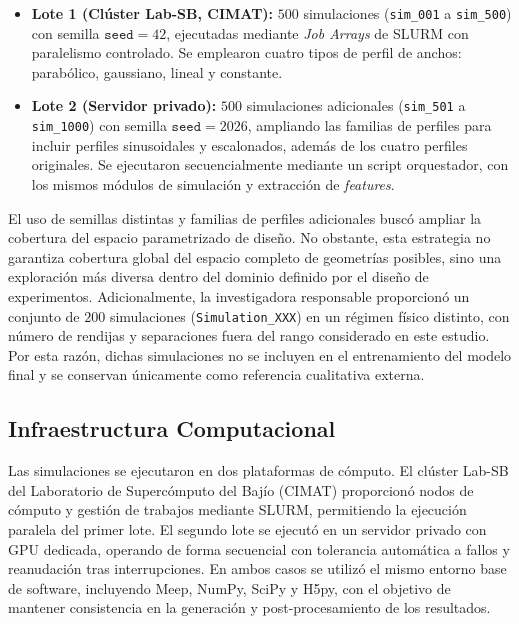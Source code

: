 \begin{itemize}
\item \textbf{Lote 1 (Clúster Lab-SB, CIMAT):} $500$ simulaciones (\texttt{sim\_001} a \texttt{sim\_500}) con semilla $\texttt{seed}=42$, ejecutadas mediante \textit{Job Arrays} de SLURM con paralelismo controlado. Se emplearon cuatro tipos de perfil de anchos: parabólico, gaussiano, lineal y constante.

\item \textbf{Lote 2 (Servidor privado):} $500$ simulaciones adicionales (\texttt{sim\_501} a \texttt{sim\_1000}) con semilla $\texttt{seed}=2026$, ampliando las familias de perfiles para incluir perfiles sinusoidales y escalonados, además de los cuatro perfiles originales. Se ejecutaron secuencialmente mediante un script orquestador, con los mismos módulos de simulación y extracción de \textit{features}.

\end{itemize}

El uso de semillas distintas y familias de perfiles adicionales buscó ampliar la cobertura del espacio parametrizado de diseño. No obstante, esta estrategia no garantiza cobertura global del espacio completo de geometrías posibles, sino una exploración más diversa dentro del dominio definido por el diseño de experimentos. Adicionalmente, la investigadora responsable proporcionó un conjunto de $200$ simulaciones (\texttt{Simulation\_XXX}) en un régimen físico distinto, con número de rendijas y separaciones fuera del rango considerado en este estudio. Por esta razón, dichas simulaciones no se incluyen en el entrenamiento del modelo final y se conservan únicamente como referencia cualitativa externa.

\subsection{Infraestructura Computacional}\label{subsec:infraestructura}

Las simulaciones se ejecutaron en dos plataformas de cómputo. El clúster Lab-SB del Laboratorio de Supercómputo del Bajío (CIMAT) proporcionó nodos de cómputo y gestión de trabajos mediante SLURM, permitiendo la ejecución paralela del primer lote. El segundo lote se ejecutó en un servidor privado con GPU dedicada, operando de forma secuencial con tolerancia automática a fallos y reanudación tras interrupciones. En ambos casos se utilizó el mismo entorno base de software, incluyendo Meep, NumPy, SciPy y H5py, con el objetivo de mantener consistencia en la generación y post-procesamiento de los resultados.

